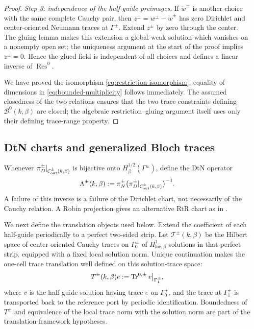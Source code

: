 \begin{proof}
\emph{Step 3: independence of the half-guide preimages.}
If $\widetilde w^\pm$ is another choice with the same complete Cauchy pair,
then $z^\pm=w^\pm-\widetilde w^\pm$ has zero Dirichlet and center-oriented
Neumann traces at $\Gamma^\pm$.  Extend $z^\pm$ by zero through the center.
The gluing lemma makes this extension a global weak solution which vanishes
on a nonempty open set; the uniqueness argument at the start of the proof
implies $z^\pm=0$.  Hence the glued field is independent of all choices and
defines a linear inverse of $\operatorname{Res}^0$.

We have proved the isomorphism \eqref{eq:restriction-isomorphism}; equality of
dimensions in \eqref{eq:bounded-multiplicity} follows immediately.  The
assumed closedness of the two relations ensures that the two trace constraints
defining $\mathcal B^0(k,\beta)$ are closed; the algebraic restriction--gluing
argument itself uses only their defining trace-range property.
\end{proof}

\subsection{DtN charts and generalized Bloch traces}

Whenever $\pi_D^\pm|_{\mathcal{C}^{\pm}_{\mathrm{out}}(k,\beta)}$ is bijective onto
$H^{1/2}_\beta(\Gamma^\pm)$, define the DtN operator
\begin{equation}
  \Lambda^\pm(k,\beta):=
  \pi_N^\pm\bigl(\pi_D^\pm|_{\mathcal{C}^{\pm}_{\mathrm{out}}(k,\beta)}\bigr)^{-1}.
  \label{eq:DtN-definition}
\end{equation}
A failure of this inverse is a failure of the Dirichlet chart, not necessarily
of the Cauchy relation.  A Robin projection gives an alternative RtR chart as
in \cite{FlissKlindworthSchmidt2015}.

We next define the translation objects used below.  Extend the coefficient of
each half-guide periodically to a perfect two-sided strip.  Let
$\mathscr T^\pm(k,\beta)$ be the Hilbert space of center-oriented Cauchy traces
on $\Gamma_0^\pm$ of $H^1_{\mathrm{loc},\beta}$ solutions in that perfect
strip, equipped with a fixed local solution norm.  Unique continuation makes
the one-cell trace translation well defined on this solution-trace space:
\begin{equation}
  T^\pm(k,\beta)e:=\operatorname{Tr}^{0,\pm} v\big|_{\Gamma_1^\pm},
  \label{eq:translation-operator}
\end{equation}
where $v$ is the half-guide solution having trace $e$ on $\Gamma_0^\pm$, and the
trace at $\Gamma_1^\pm$ is transported back to the reference port by periodic
identification.  Boundedness of $T^\pm$ and equivalence of the local trace norm
with the solution norm are part of the translation-framework hypotheses.

